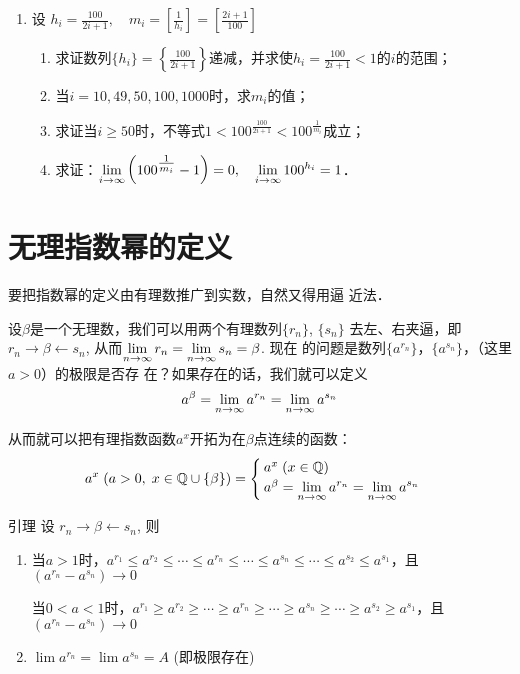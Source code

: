 \begin{enumerate}
\item  设 $h_{i}=\frac{100}{2 i+1},\quad  m_{i}=\left[\frac{1}{h_{i}}\right]=\left[\frac{2 i+1}{100}\right]$
\begin{enumerate}
  \item 求证数列$\{h_i\}=\left\{\frac{100}{2 i+1}\right\}$递减，并求使$h_i=\frac{100}{2i+1}<1$的$i$的范围；
  \item 当$i=10,49,50,100,1000$时，求$m_i$的值；
  \item 求证当$i\ge 50$时，不等式$1<100^{\tfrac{100}{2i+1}}<100^{\tfrac{1}{m_i}}$成立；
  \item 求证：$\displaystyle\lim_{i\to\infty}\left(100^{\tfrac{1}{m_i}}-1\right)=0,\quad \displaystyle\lim_{i\to\infty}100^{h_i}=1$．
\end{enumerate}
\end{enumerate}

\section{无理指数幂的定义}
要把指数幂的定义由有理数推广到实数，自然又得用逼
近法．

设$\beta$是一个无理数，我们可以用两个有理数列$\{r_n\}$, $\{s_n\}$
去左、右夹逼，即$r_n\to \beta\leftarrow s_n$, 从而$\displaystyle\lim_{n\to\infty}r_n=\displaystyle\lim_{n\to\infty}s_n=\beta$. 现在
的问题是数列$\{a^{r_n}\}$，$\{a^{s_n}\}$，（这里$a>0$）的极限是否存
在？如果存在的话，我们就可以定义
\[a^{\beta}=\displaystyle\lim_{n\to\infty}a^{r_n}=\displaystyle\lim_{n\to\infty}a^{s_n}\]

从而就可以把有理指数函数$a^x$开拓为在$\beta$点连续的函数：
\[a^x\; (a>0,\; x\in \mathbb{Q}\cup\{\beta\})=\begin{cases}
  a^x\;  (x\in\mathbb{Q})\\
  a^{\beta}=\displaystyle\lim_{n\to\infty}a^{r_n}=\displaystyle\lim_{n\to\infty}a^{s_n}
\end{cases}\]

\begin{blk}{引理}
   设 $r_{n} \rightarrow \beta \leftarrow s_{n}$, 则
\begin{enumerate}
  \item 当$a>1$时，$a^{r_1}\le a^{r_2}\le \cdots\le a^{r_n}\le \cdots \le a^{s_n}\le \cdots\le a^{s_2}\le a^{s_1}$，且$\left(a^{r_n}-a^{s_n}\right)\to 0$
 
  当$0<a<1$时，$a^{r_1}\ge a^{r_2}\ge \cdots\ge a^{r_n}\ge \cdots \ge a^{s_n}\ge \cdots\ge a^{s_2}\ge a^{s_1}$，且$\left(a^{r_n}-a^{s_n}\right)\to 0$

  \item $\lim a^{r_n}=\lim a^{s_{n}}=A$ (即极限存在) 
\end{enumerate}
\end{blk}

